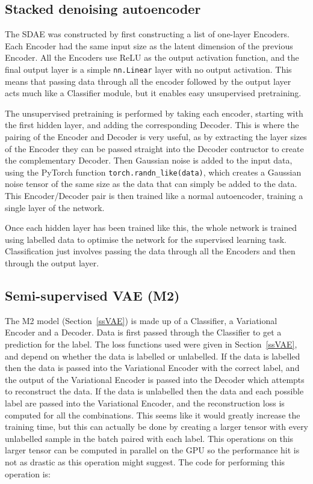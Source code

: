 \subsection{Stacked denoising autoencoder}
The SDAE was constructed by first constructing a list of one-layer Encoders. Each Encoder had the same input size as the latent dimension of the 
previous Encoder. All the Encoders use ReLU as the output activation function, and the final output layer is a simple \texttt{nn.Linear} layer with 
no output activation. This means that passing data through all the encoder followed by the output layer acts much like 
a Classifier module, but it enables easy unsupervised pretraining.

The unsupervised pretraining is performed by taking each encoder, starting with the first hidden layer, and adding the corresponding 
Decoder. This is where the pairing of the Encoder and Decoder is very useful, as by extracting the layer sizes of the Encoder they 
can be passed straight into the Decoder contructor to create the complementary Decoder. Then Gaussian noise is added to the input data,
using the PyTorch function \texttt{torch.randn\_like(data)}, which creates a Gaussian noise tensor of the same size as the data that can
simply be added to the data. This Encoder/Decoder pair is then trained like a normal autoencoder, training a single layer of the network.

Once each hidden layer has been trained like this, the whole network is trained using labelled data to optimise the network for the 
supervised learning task. Classification just involves passing the data through all the Encoders and then through 
the output layer.

\subsection{Semi-supervised VAE (M2)}

The M2 model (Section~\ref{ssVAE}) is made up of a Classifier, a Variational Encoder and a Decoder.
Data is first passed through the Classifier to get a prediction for the label. The loss functions used were given in Section~\ref{ssVAE}, 
and depend on whether the data is labelled or unlabelled. If the data is labelled then the data is passed into the Variational Encoder 
with the correct label, and the output of the Variational Encoder is passed into the Decoder which attempts to reconstruct the data.
If the data is unlabelled then the data and each possible label are passed into the Variational Encoder, and the reconstruction loss 
is computed for all the combinations. This seems like it would greatly increase the training time, but this can actually be done 
by creating a larger tensor with every unlabelled sample in the batch paired with each label. This operations on this larger tensor 
can be computed in parallel on the GPU so the performance hit is not as drastic as this operation might suggest. The code for performing this 
operation is:

